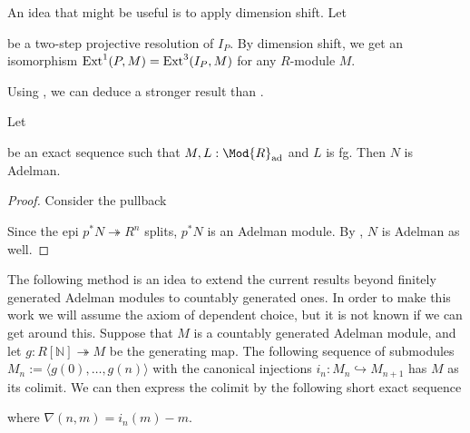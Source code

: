 
An idea that might be useful is to apply dimension shift. Let
\begin{center}
\end{center}
be a two-step projective resolution of $I_P$.
By dimension shift, we get an isomorphism $\textup{Ext}^1(P,M) = \textup{Ext}^3(I_P,M)$ for any $R$-module $M$.

Using , we can deduce a stronger result than .

\begin{proposition}
  \label{fg-extension-adelman}
  Let
  \begin{center}
  \end{center}
  be an exact sequence such that $M,L : \Mod{R}_{\textup{ad}}$ and $L$ is fg.
  Then $N$ is Adelman.
\end{proposition}

\begin{proof}
  Consider the pullback
  \begin{center}
  \end{center}
  Since the epi $p^*N \twoheadrightarrow R^n$ splits, $p^*N$ is an Adelman module.
  By , $N$ is Adelman as well.
\end{proof}

The following method is an idea to extend the current results beyond finitely generated Adelman modules to countably generated ones.
In order to make this work we will assume the axiom of dependent choice, but it is not known if we can get around this.
Suppose that $M$ is a countably generated Adelman module, and let $g : R[\mathbb{N}] \twoheadrightarrow M$ be the generating map.
The following sequence of submodules $M_n := \langle g(0), \ldots, g(n) \rangle$ with the canonical injections $i_n : M_n \hookrightarrow M_{n+1}$ has $M$ as its colimit.
We can then express the colimit by the following short exact sequence
\begin{center}
\end{center}
where $\nabla(n,m) = i_n(m) - m$.

